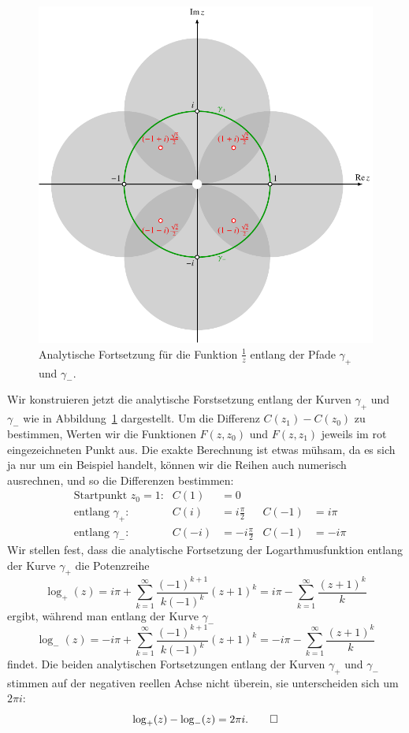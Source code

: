 \begin{beispiel}
\begin{figure}
\centering
\includegraphics{chapters/080-funktionentheorie/images/fortsetzreziprok.pdf}
\caption{Analytische Fortsetzung für die Funktion $\frac1z$
entlang der Pfade $\gamma_+$ und $\gamma_-$.
\label{komplex:logfortsetzung}}
\end{figure}
Wir konstruieren jetzt die analytische Forstsetzung entlang der Kurven
$\gamma_+$ und $\gamma_-$ wie in Abbildung~\ref{komplex:logfortsetzung}
dargestellt.
Um die Differenz $C(z_1)-C(z_0)$ zu bestimmen, Werten wir die Funktionen
$F(z,z_0)$ und $F(z,z_1)$ jeweils im rot eingezeichneten Punkt aus.
Die exakte Berechnung ist etwas mühsam, da es sich ja nur um ein Beispiel
handelt, können wir die Reihen auch numerisch ausrechnen, und so die
Differenzen bestimmen:
\begin{align*}
&\text{Startpunkt $z_0=1$:}& C(1)&=0             &       &       \\
&\text{entlang $\gamma_+$:}& C(i)&= i\frac{\pi}2 & C(-1) &=  i\pi\\
&\text{entlang $\gamma_-$:}&C(-i)&=-i\frac{\pi}2 & C(-1) &= -i\pi
\end{align*}
Wir stellen fest, dass die analytische Fortsetzung der Logarthmusfunktion
entlang der Kurve $\gamma_+$ die Potenzreihe
\[
\log_+(z)
=
i\pi +\sum_{k=1}^\infty \frac{(-1)^{k+1}}{k(-1)^k}(z+1)^k
=
i\pi
-
\sum_{k=1}^\infty \frac{(z+1)^k}{k}
\]
ergibt, während man entlang der  Kurve $\gamma_-$
\[
\log_-(z)
=
-i\pi +\sum_{k=1}^\infty \frac{(-1)^{k+1}}{k(-1)^k}(z+1)^k
=
-i\pi
-
\sum_{k=1}^\infty \frac{(z+1)^k}{k}
\]
findet.
Die beiden analytischen Fortsetzungen entlang der Kurven $\gamma_+$ und
$\gamma_-$ stimmen auf der negativen reellen Achse nicht überein,
sie unterscheiden sich um $2\pi i$:
\[
\log_+(z)-\log_-(z)=2\pi i.
\qedhere
\]
\end{beispiel}

